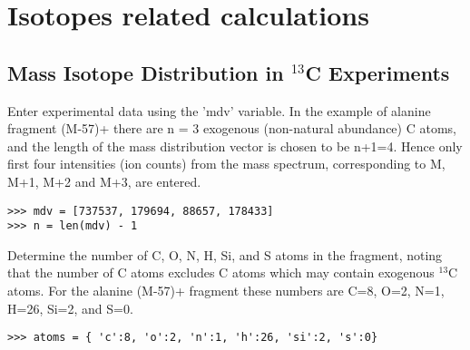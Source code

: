 

\chapter{Isotopes related calculations}

\section
{Mass Isotope Distribution in $^{13}$C Experiments}


Enter experimental data using the 'mdv' variable. In the example of
alanine fragment (M-57)+ there are n = 3 exogenous (non-natural
abundance) C atoms, and the length of the mass distribution vector
is chosen to be n+1=4. Hence only first four intensities (ion counts)
from the mass spectrum, corresponding to M, M+1, M+2 and M+3,
are entered.

\begin{verbatim}
>>> mdv = [737537, 179694, 88657, 178433] 
>>> n = len(mdv) - 1
\end{verbatim}

Determine the number of C, O, N, H, Si, and S atoms in the fragment,
noting that the number of C atoms excludes C atoms which may contain
exogenous $^{13}$C atoms. For the alanine (M-57)+ fragment these
numbers are C=8, O=2, N=1, H=26, Si=2, and S=0.

\begin{verbatim} 
>>> atoms = { 'c':8, 'o':2, 'n':1, 'h':26, 'si':2, 's':0}
\end{verbatim}

